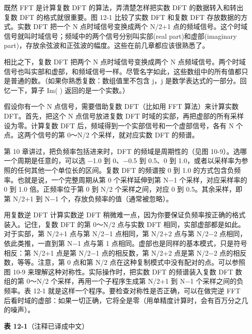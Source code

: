 既然 FFT 是计算复数 DFT 的算法，弄清楚怎样把实数 DFT
的数据转入和转出复数 DFT 的格式就很重要。图 12-1 比较了实数 DFT 和复数
DFT 存放数据的方式。实数 DFT 把一个 N 点时域信号变换成两个 N/2+1
点的频域信号。这个时域信号就叫时域信号；频域中的两个信号分别叫实部(real
part)和虚部(imaginary
part)，存放余弦波和正弦波的幅度。这些在前几章都应该很熟悉了。

相比之下，复数 DFT 把两个 N 点时域信号变换成两个 N
点频域信号。两个时域信号也叫实部和虚部，和频域信号一样。尽管名字如此，这些数组中的所有值都只是普通的数。（如果你熟悉复数：数组值里不包含
j，j 是数学表达式的一部分。回忆一下，算子 Im( ) 返回的是一个实数。）

假设你有一个 N 点信号，需要借助复数 DFT（比如用 FFT 算法）来计算实数
DFT。首先，把这个 N 点信号放进复数 DFT
时域的实部，再把虚部的所有采样设为零。计算复数 DFT
后，频域得到一个实部信号和一个虚部信号，各有 N 个点。这两个信号的第
0～N/2 个采样，就对应实数 DFT 的频谱。

第 10 章讲过，把负频率包括进来时，DFT 的频域是周期性的（见图
10-9）。选哪一个周期是任意的，可以选 −1.0 到 0、−0.5 到 0.5、0 到
1.0，或者以采样率为参照的任何其他一个单位长的区间。复数 DFT 的频谱按 0
到 1.0 的方式包含负频率。也就是说，一个完整周期从第 0 个采样延伸到第 N−1
个采样，对应采样率的 0 到 1.0 倍。正频率位于第 0 到 N/2 个采样之间，对应
0 到 0.5。其余采样，即第 N/2+1 到 N−1 个，存放负频率的值（通常被忽略）。

用复数逆 DFT 计算实数逆 DFT
稍微难一点，因为你要保证负频率按正确的格式装入。记住，复数 DFT 的第
0～N/2 点与实数 DFT 相同，实部虚部都是如此。对于实部，第 N/2+1 点与第
N/2−1 点相同，第 N/2+2 点与第 N/2−2 点相同，依此类推，一直到第 N−1
点与第 1 点相同。虚部也是同样的基本模式，只是符号相反：第 N/2+1 点是第
N/2−1 点的相反数，第 N/2+2 点是第 N/2−2 点的相反数，等等。注意，第 0
点和第 N/2 点在这种复制模式中没有配对的点。可以参照图 10-9
来理解这种对称性。实际操作时，把实数 DFT 的频谱装入复数 DFT 数组的第
0～N/2 个采样，再用一个子程序生成第 N/2+1 到 N−1 个采样之间的负频率。表
12-1 就是这样一个程序。要检查对称性是否正确，可以在做完逆 FFT
后看时域的虚部：如果一切正确，它将全是零（用单精度计算时，会有百万分之几的噪声）。

\textbf{表 12-1}（注释已译成中文）

\begin{Shaded}
\begin{Highlighting}[]
\NormalTok{6050 \textquotesingle{}}
\NormalTok{6100 \textquotesingle{}}
\end{Highlighting}
\end{Shaded}

